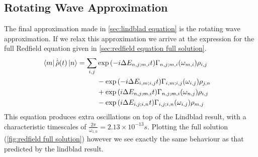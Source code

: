 \subsection{Rotating Wave Approximation}\label{sec:rotating wave approximation}
The final approximation made in
\cref{sec:lindblad equation}
is the rotating wave approximation.
If we relax this approximation
we arrive at the expression
for the full Redfield equation given in
\cref{sec:redfield equation full solution}.
\begin{align}
    \bra{m}\dot{\hat{\rho{}}}(t) \ket{n} & = \begin{aligned}[t]
        \sum_{i,j} &
        \exp{(-i\Delta{}E_{n,j;m,i} t)}
        \Gamma_{n,j;m, i}(\omega_{m,i})
        \rho_{i,j}   \\
                   &
        -\exp{(-i\Delta{}E_{i,m;i,j} t)}
        \Gamma_{i,m;i, j}(\omega_{i,j})
        \rho_{j, n}  \\
                   &
        +\exp{(i\Delta{}E_{n,j;m,i} t)}
        \Gamma_{n,j; m, i}(\omega_{n,j})
        \rho_{i, j}  \\
                   &
        -\exp{(i\Delta{}E_{i,j;i,n} t)}
        \Gamma_{i,j; i, n}(\omega_{i,j})
        \rho_{m, j}
    \end{aligned}
\end{align}
This equation produces extra oscillations
on top of the Lindblad result, with
a characteristic timescales of
\(\frac{2\pi}{\omega_{1,0}} = 2.13\times{}10^{-13}s\). Plotting
the full solution (\cref{fig:redfield full solution})
however we see exactly the same behaviour as that
predicted by the lindblad result.
